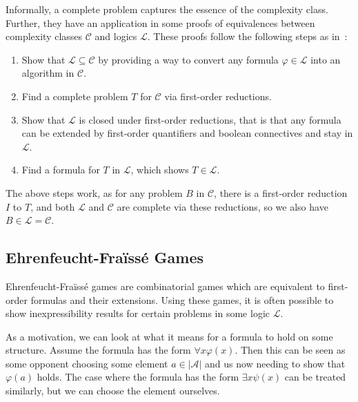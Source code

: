 Informally, a complete problem captures the essence of the complexity class.
Further, they have an application in some proofs of equivalences between complexity classes $\mathcal{C}$ and logics $\mathcal{L}$.
These proofs follow the following steps as in~\cite{descriptive-complexity}:
\begin{enumerate}
    \item Show that $\mathcal{L} \subseteq \mathcal{C}$ by providing a way to convert any formula $\varphi \in \mathcal{L}$ into an algorithm in $\mathcal{C}$.
    \item Find a complete problem $T$ for $\mathcal{C}$ via first-order reductions.
    \item Show that $\mathcal{L}$ is closed under first-order reductions, that is that any formula can be extended by first-order quantifiers and boolean connectives and stay in $\mathcal{L}$.
    \item Find a formula for $T$ in $\mathcal{L}$, which shows $T \in \mathcal{L}$.
\end{enumerate}
The above steps work, as for any problem $B$ in $\mathcal{C}$, there is a first-order reduction $I$ to $T$, and both $\mathcal{L}$ and $\mathcal{C}$ are complete via these reductions, so we also have $B \in \mathcal{L} = \mathcal{C}$.

\subsection{Ehrenfeucht-Fraïssé Games}\label{subsec:ehrenfeucht-fraisse-games}

Ehrenfeucht-Fraïssé games are combinatorial games which are equivalent to first-order formulas and their extensions.
Using these games, it is often possible to show inexpressibility results for certain problems in some logic $\mathcal{L}$.

As a motivation, we can look at what it means for a formula to hold on some structure.
Assume the formula has the form $\forall x\varphi(x)$.
Then this can be seen as some opponent choosing some element $a \in |\mathcal{A}|$ and us now needing to show that $\varphi(a)$ holds.
The case where the formula has the form $\exists x\psi(x)$ can be treated similarly, but we can choose the element ourselves.

